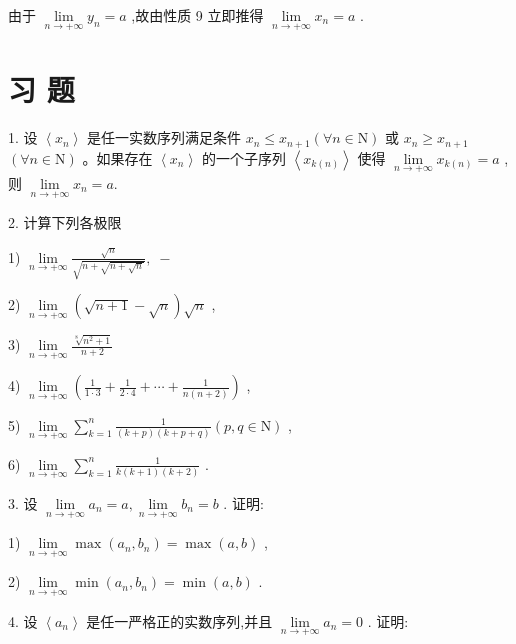 由于 $\mathop{\lim }\limits_{{n \rightarrow   + \infty }}{y}_{n} = a$ ,故由性质 9 立即推得 $\mathop{\lim }\limits_{{n \rightarrow   + \infty }}{x}_{n} = a$ .

\section*{习 题}

1. 设 $\left\langle  {x}_{n}\right\rangle$ 是任一实数序列满足条件 ${x}_{n} \leq  {x}_{n + 1}\left( {\forall n \in  \mathrm{N}}\right)$ 或 ${x}_{n} \geq  {x}_{n + 1}$  $\left( {\forall n \in  \mathrm{N}}\right)$ 。如果存在 $\left\langle  {x}_{n}\right\rangle$ 的一个子序列 $\left\langle  {x}_{k\left( n\right) }\right\rangle$ 使得 $\mathop{\lim }\limits_{{n \rightarrow   + \infty }}{x}_{k\left( n\right) } = a$ ,则 $\mathop{\lim }\limits_{{n \rightarrow   + \infty }}{x}_{n} = a.$

2. 计算下列各极限

1) $\mathop{\lim }\limits_{{n \rightarrow   + \infty }}\frac{\sqrt{n}}{\sqrt{n + \sqrt{n + \sqrt{n}}}},\; -$

2) $\mathop{\lim }\limits_{{n \rightarrow   + \infty }}\left( {\sqrt{n + 1} - \sqrt{n}}\right) \sqrt{n}$ ,

3) $\mathop{\lim }\limits_{{n \rightarrow   + \infty }}\frac{\sqrt[8]{{n}^{2} + 1}}{n + 2}$

4) $\mathop{\lim }\limits_{{n \rightarrow   + \infty }}\left( {\frac{1}{1 \cdot  3} + \frac{1}{2 \cdot  4} + \cdots  + \frac{1}{n\left( {n + 2}\right) }}\right)$ ,

5) $\mathop{\lim }\limits_{{n \rightarrow   + \infty }}\mathop{\sum }\limits_{{k = 1}}^{n}\frac{1}{\left( {k + p}\right) \left( {k + p + q}\right) }\left( {p,q \in  \mathrm{N}}\right)$ ,

6) $\mathop{\lim }\limits_{{n \rightarrow   + \infty }}\mathop{\sum }\limits_{{k = 1}}^{n}\frac{1}{k\left( {k + 1}\right) \left( {k + 2}\right) }$ .

3. 设 $\mathop{\lim }\limits_{{n \rightarrow   + \infty }}{a}_{n} = a,\mathop{\lim }\limits_{{n \rightarrow   + \infty }}{b}_{n} = b$ . 证明:

1) $\mathop{\lim }\limits_{{n \rightarrow   + \infty }}\max \left( {{a}_{n},{b}_{n}}\right)  = \max \left( {a,b}\right)$ ,

2) $\mathop{\lim }\limits_{{n \rightarrow   + \infty }}\min \left( {{a}_{n},{b}_{n}}\right)  = \min \left( {a,b}\right)$ .

4. 设 $\left\langle  {a}_{n}\right\rangle$ 是任一严格正的实数序列,并且 $\mathop{\lim }\limits_{{n \rightarrow   + \infty }}{a}_{n} = 0$ . 证明:

